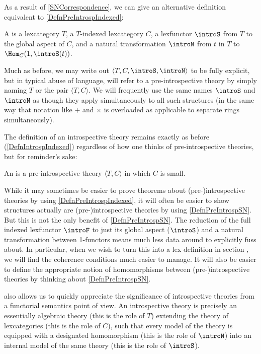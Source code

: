 As a result of \cref{SNCorrespondence}, we can give an alternative definition equivalent to \cref{DefnPreIntrospIndexed}:

\begin{definition}\label{DefnPreIntrospSN}
A  is a lexcategory $T$, a $T$-indexed lexcategory $C$, a lexfunctor $\introS$ from $T$ to the global aspect of $C$, and a natural transformation $\introN$ from $t$ in $T$ to $\Hom_C(1, \introS(t))$.
\end{definition}

Much as before, we may write out $\langle T, C, \introS, \introN \rangle$ to be fully explicit, but in typical abuse of language, will refer to a pre-introspective theory by simply naming $T$ or the pair $\langle T, C\rangle$. We will frequently use the same names $\introS$ and $\introN$ as though they apply simultaneously to all such structures (in the same way that notation like $+$ and $\times$ is overloaded as applicable to separate rings simultaneously).

The definition of an introspective theory remains exactly as before (\cref{DefnIntrospIndexed}) regardless of how one thinks of pre-introspective theories, but for reminder's sake:

\begin{definition} \label{DefnIntrospSN}
An  is a pre-introspective theory $\langle T, C \rangle$ in which $C$ is small.
\end{definition}

While it may sometimes be easier to prove theorems about (pre-)introspective theories by using \cref{DefnPreIntrospIndexed}, it will often be easier to show structures actually are (pre-)introspective theories by using \cref{DefnPreIntrospSN}. But this is not the only benefit of \cref{DefnPreIntrospSN}. The reduction of the full indexed lexfunctor $\introF$ to just its global aspect ($\introS$) and a natural transformation between 1-functors means much less data around to explicitly fuss about. In particular, when we wish to turn this into a lex definition in section \TODO, we will find the coherence conditions much easier to manage. It will also be easier to define the appropriate notion of homomorphisms between (pre-)introspective theories by thinking about \cref{DefnPreIntrospSN}.

 also allows us to quickly appreciate the significance of introspective theories from a functorial semantics point of view. An introspective theory is precisely an essentially algebraic theory (this is the role of $T$) extending the theory of lexcategories (this is the role of $C$), such that every model of the theory is equipped with a designated homomorphism (this is the role of $\introN$) into an internal model of the same theory (this is the role of $\introS$).

